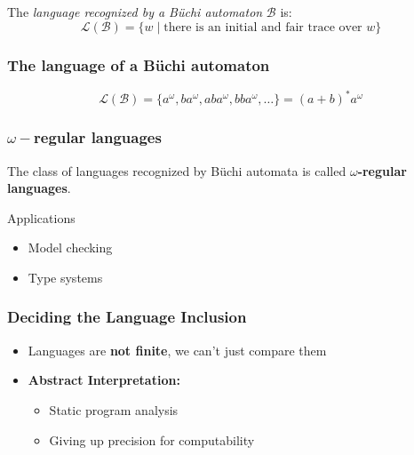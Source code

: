 \documentclass{beamer}
\newcommand{\Buchi}{B{\"u}chi}
\begin{document}
\begin{frame}
The \emph{language recognized by a \Buchi{} automaton} $\mathcal{B}$ is:
\[ \mathcal{L}(\mathcal{B}) = \{w \;|\; \textrm{there is an initial and fair trace over $w$} \} \]

\begin{example}
\frametitle{The language of a \Buchi{} automaton}
\begin{figure}[h]
\centering
{}
\end{figure}
\[ \mathcal{L}(\mathcal{B}) = \{a ^{\omega}, b a ^{\omega}, ab a^{\omega}, bb a^{\omega}, \dots\} = (a + b)^* a ^{\omega} \]
\end{example}

\end{frame}

\begin{frame}
\frametitle{$\omega-$regular languages}
\begin{definition}
The class of languages recognized by \Buchi{} automata is called
\textbf{$\omega$-regular languages}.
\end{definition}
Applications
\begin{itemize}
\item Model checking
\item Type systems
\end{itemize}
\end{frame}

\begin{frame}
\frametitle{Deciding the Language Inclusion}
\begin{itemize}
\item Languages are \textbf{not finite}, we can't just compare them
\pause
\item \textbf{Abstract Interpretation:}
    \begin{itemize}
    \item Static program analysis
    \item Giving up precision for computability
    \end{itemize}
\end{itemize}
\end{frame}
\end{document}
